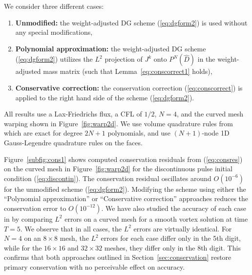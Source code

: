 \documentclass[preprint,10pt]{article}
\theoremstyle{definition}
\theoremstyle{lemma}
\theoremstyle{theorem}
\theoremstyle{assumption}
\renewcommand{\hat}{\widehat}
\newcommand{\note}[1]{{\color{blue}{#1}}}
\begin{document}
{We consider three different cases:
\begin{enumerate}
\item \textbf{Unmodified:} the weight-adjusted DG scheme (\ref{eq:dgform2}) is used without any special modifications,
\item \textbf{Polynomial approximation:} the weight-adjusted DG scheme (\ref{eq:dgform2}) utilizes the $L^2$ projection of $J^k$ onto $P^N(\hat{D})$ in the weight-adjusted mass matrix (such that Lemma~\ref{eq:conscorrect1} holds), 
\item \textbf{Conservative correction:} the conservation correction (\ref{eq:conscorrect}) is applied to the right hand side of the scheme (\ref{eq:dgform2}).  
\end{enumerate}
All results use a Lax-Friedrichs flux, a CFL of $1/2$, $N=4$, and the curved mesh warping shown in Figure~\ref{fig:warp2d}.  We use volume quadrature rules from \cite{xiao2010quadrature} which are exact for degree $2N+1$ polynomials, and use $(N+1)$-node 1D Gauss-Legendre quadrature rules on the faces.  

Figure~\ref{subfig:cons1} shows computed conservation residuals from (\ref{eq:consres}) on the curved mesh in Figure~\ref{fig:warp2d} for the discontinuous pulse initial condition (\ref{eq:discontin}).  The conservation residual oscillates around $O(10^{-6})$ for the unmodified scheme (\ref{eq:dgform2}).  Modifying the scheme using either the ``Polynomial approximation'' or ``Conservative correction'' approaches reduces the conservation error to $O(10^{-12})$.  %
We have also studied the accuracy of each case in by comparing $L^2$ errors on a curved mesh for a smooth vortex solution  at time $T=5$.  We observe that in all cases, the $L^2$ errors are virtually identical.  For $N=4$ on an $8\times 8$ mesh, the $L^2$ errors for each case differ only in the 5th digit, while for the $16\times 16$ and $32\times 32$ meshes, they differ only in the 8th digit.  This confirms that both approaches outlined in Section~\ref{sec:conservation} restore primary conservation with no perceivable effect on accuracy.  


\begin{figure}
\centering
{}
\end{figure}}
\end{document}
